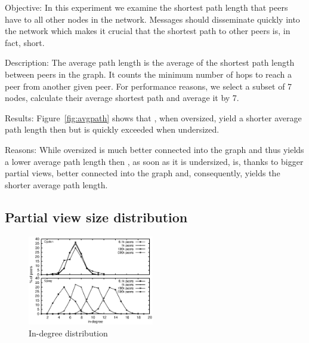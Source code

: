 \begin{asparadesc}
\item[Objective:] In this experiment we examine the shortest path length that
  peers have to all other nodes in the network.  Messages should disseminate
  quickly into the network which makes it crucial that the shortest path to
  other peers is, in fact, short.
\item[Description:] The average path length is the average of the shortest path
  length between peers in the graph. It counts the minimum number of hops to
  reach a peer from another given peer.  For performance reasons, we select a
  subset of 7 nodes, calculate their average shortest path and average it by 7.
\item[Results:] Figure~\ref{fig:avgpath} shows that \CYCLON{}, when oversized,
  yield a shorter average path length then \SCAMPLON{} but is quickly exceeded
  when undersized.
\item[Reasons:] While oversized \CYCLON{} is much better connected into the
  graph and thus yields a lower average path length then \SCAMPLON{}, as soon
  as it is undersized, \SCAMPLON{} is, thanks to bigger partial views, better
  connected into the graph and, consequently, yields the shorter average path
  length.
\end{asparadesc}

\subsection{Partial view size distribution}
\label{subsec:dist}

\begin{figure}
  \centering
  \includegraphics[width=0.49\textwidth]{img/histo.eps}
  \caption{\label{fig:histo}In-degree distribution}
\end{figure}

